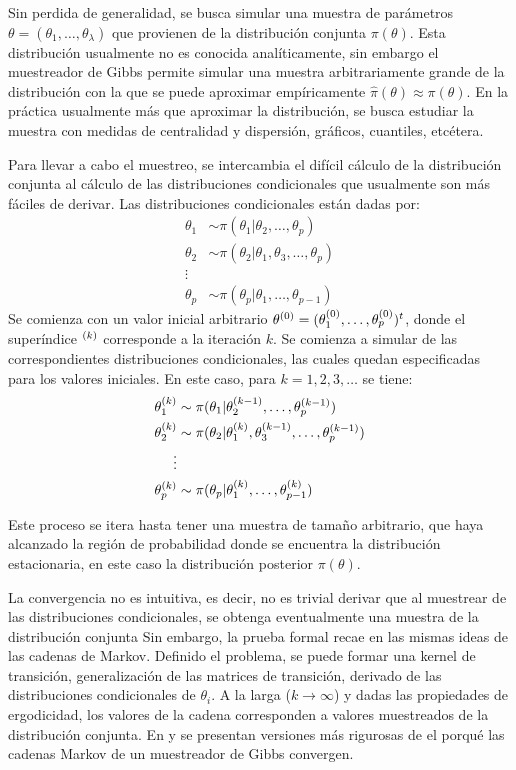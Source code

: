 \documentclass[../Main/Main.tex]{subfiles}
\begin{document}
Sin perdida de generalidad, se busca simular una muestra de parámetros $\theta = (\theta_1,\ldots,\theta_\lambda)$ que provienen de la distribución conjunta $\pi(\theta)$. Esta distribución usualmente no es conocida analíticamente, sin embargo el muestreador de Gibbs permite simular una muestra arbitrariamente grande de la distribución con la que se puede aproximar empíricamente $\hat{\pi}(\theta) \approx \pi(\theta)$. En la práctica usualmente más que aproximar la distribución, se busca estudiar la muestra con medidas de centralidad y dispersión, gráficos, cuantiles, etcétera.

Para llevar a cabo el muestreo, se intercambia el difícil cálculo de la distribución conjunta al cálculo de las distribuciones condicionales que usualmente son más fáciles de derivar. Las distribuciones condicionales están dadas por: 
\begin{align}
	\theta_1 &\sim \pi(\theta_1|\theta_2,\ldots,\theta_p) \label{ec:DistCondicionales}\\
	\theta_2 &\sim \pi(\theta_2|\theta_1,\theta_3,\ldots,\theta_p)\nonumber \\ 
	\vdots \nonumber\\
	\theta_p &\sim \pi(\theta_p|\theta_1,\ldots,\theta_{p-1}) \nonumber
\end{align}
Se comienza con un valor inicial arbitrario $\theta^{(0)} = (\theta_1^{(0)},\ldots,\theta_p^{(0)})^t$, donde el superíndice $^{(k)}$ corresponde a la iteración $k$. Se comienza a simular de las correspondientes distribuciones condicionales, las cuales quedan especificadas para los valores iniciales. En este caso, para $k = 1,2,3,\ldots$ se tiene:
\begin{align}
	\theta_1^{(k)} &\sim \pi(\theta_1|\theta_2^{(k-1)},\ldots,\theta_p^{(k-1)}) \label{ec:GibbsSampler}\\
	\theta_2^{(k)} &\sim \pi(\theta_2|\theta_1^{(k)},\theta_3^{(k-1)},\ldots,\theta_p^{(k-1)})\nonumber \\ 
	\vdots \nonumber\\
	\theta_p^{(k)} &\sim \pi(\theta_p|\theta_1^{(k)},\ldots,\theta_{p-1}^{(k)}) \nonumber
\end{align}

Este proceso se itera hasta tener una muestra de tamaño arbitrario, que haya alcanzado la región de probabilidad donde se encuentra la distribución estacionaria, en este caso la distribución posterior $\pi(\theta)$.

La convergencia no es intuitiva, es decir, no es trivial derivar que al muestrear de las distribuciones condicionales, se obtenga eventualmente  una muestra de la distribución conjunta  Sin embargo, la prueba formal recae en  las mismas ideas de las cadenas de Markov. Definido el problema, se puede formar una kernel de transición, generalización de las matrices de transición, derivado de las  distribuciones condicionales de $\theta_i$. A la larga ($k \rightarrow \infty$) y dadas las propiedades de ergodicidad, los valores de la cadena corresponden a valores muestreados de la distribución conjunta. En \citet{casella1992explaining} y \citet{tierney1994markov} se presentan versiones más rigurosas de el porqué las cadenas Markov de un muestreador de Gibbs convergen. 
\end{document}
